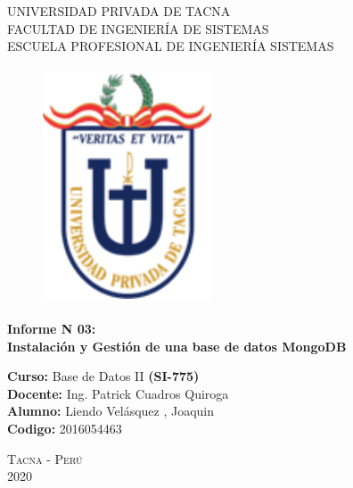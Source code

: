 \documentclass[12pt,a4paper,oneside]{book}
\begin{document}
	
	\thispagestyle{empty} 
	
	\begin{center} 
		\LARGE{UNIVERSIDAD PRIVADA DE TACNA} \\[0.5cm] \Large{FACULTAD DE INGENIERÍA DE SISTEMAS}\\[0.5cm] \large{ ESCUELA PROFESIONAL DE INGENIERÍA SISTEMAS} 
	\end{center}
	
	\begin{figure}[htb]
		\centering \includegraphics[width=5cm, height=7cm]{img/uptlogo.png}
	\end{figure}
	
	\begin{center} \LARGE{\bf Informe N 03:}\\ \vspace{.25cm} { 
			\Large \bfseries {Instalación y Gestión de una base de datos MongoDB }}\\ 
		
	\end{center}
	
	\large{\bf Curso: } Base de Datos II
	\textbf{(SI-775)}\\
	\large{\bf Docente: } Ing. Patrick Cuadros Quiroga\\
	\large{\bf Alumno: } Liendo Velásquez , Joaquin\\
	\large{\bf Codigo: } 2016054463\\
	
	
	
	\begin{center} 
		\Large \textsc{Tacna - Perú} \\
		\Large \textsc{2020 } 
	\end{center}
\end{document}

